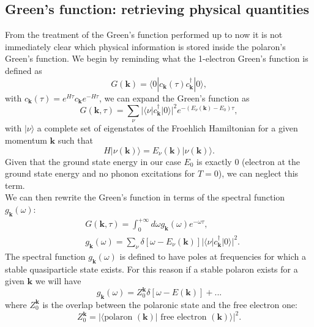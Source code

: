 \subsection{Green's function: retrieving physical quantities}
From the treatment of the Green's function performed up to now it is not immediately clear which physical information is stored inside 
the polaron's Green's function. We begin by reminding what the 1-electron Green's function is defined as
\begin{equation}
    G(\mathbf{k})=\langle 0| c_\mathbf{k}(\tau)c^\dagger_\mathbf{k}    |0 \rangle,
\end{equation}
with $c_\mathbf{k}(\tau)=e^{H\tau}c_\mathbf{k}e^{-H\tau}$, we can expand the Green's function as \cite{mishchenko2000diagrammatic}
\begin{equation}
    G(\mathbf{k},\tau)=\sum_{\nu}|\langle\nu |c^\dagger_{\mathbf{k}}|0\rangle|^2e^{-(E_\nu(\mathbf{k})-E_0)\tau},
\end{equation}
with $|\nu\rangle$ a complete set of eigenstates of the Froehlich Hamiltonian for a given momentum $\mathbf{k}$ such that
\begin{equation}
    H|\nu(\mathbf{k})\rangle=E_\nu(\mathbf{k})|\nu(\mathbf{k})\rangle.
\end{equation}
Given that the ground state energy in our case $E_0$ is exactly 0 (electron at the ground state energy and no phonon excitations for $T=0$), we can neglect this term.\\
We can then rewrite the Green's function in terms of the spectral function $g_\mathbf{k}(\omega)$:
\begin{equation}
\begin{split}
    &G(\mathbf{k},\tau)=\int_0^{+\infty}d\omega g_\mathbf{k}(\omega)e^{-\omega\tau},\\
    &g_\mathbf{k}(\omega)=\sum_\nu \delta[\omega-E_\nu(\mathbf{k})]|\langle\nu |c^\dagger_\mathbf{k}|0\rangle|^2.
\end{split}
\end{equation}
The spectral function $g_\mathbf{k}(\omega)$ is defined to have poles at frequencies for which a stable quasiparticle state exists. For this 
reason if a stable polaron exists for a given $\mathbf{k}$ we will have
\begin{equation}
    g_\mathbf{k}(\omega)=Z_0^\mathbf{k}\delta[\omega-E(\mathbf{k})]+...
\end{equation}
where $Z_0^\mathbf{k}$ is the overlap between the polaronic state and the free electron one:
\begin{equation}
    Z_0^\mathbf{k}=|\langle\text{polaron }(\mathbf{k})|\text{ free electron }(\mathbf{k})\rangle|^2.
\end{equation}
